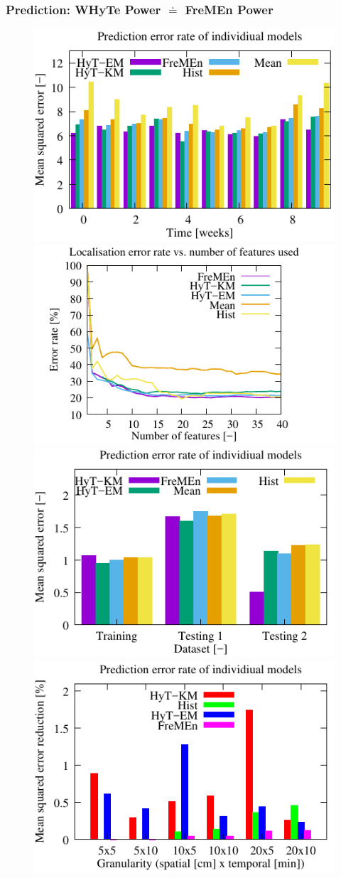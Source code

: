 \begin{frame}
	\frametitle{Prediction: WHyTe Power $\doteq$ FreMEn Power}
    \vspace{3mm}
\begin{figure}[!b]
   \begin{center}
      \includegraphics[width=0.45\columnwidth]{fig/door_graph}
    \hfill
      \includegraphics[width=0.45\columnwidth]{fig/localisation_graph}\\\vspace{5mm}
      \includegraphics[width=0.45\columnwidth]{fig/nav_graph}
    \hfill
      \includegraphics[width=0.45\columnwidth]{fig/ped_graph}
   \end{center}
\end{figure}
\end{frame}




